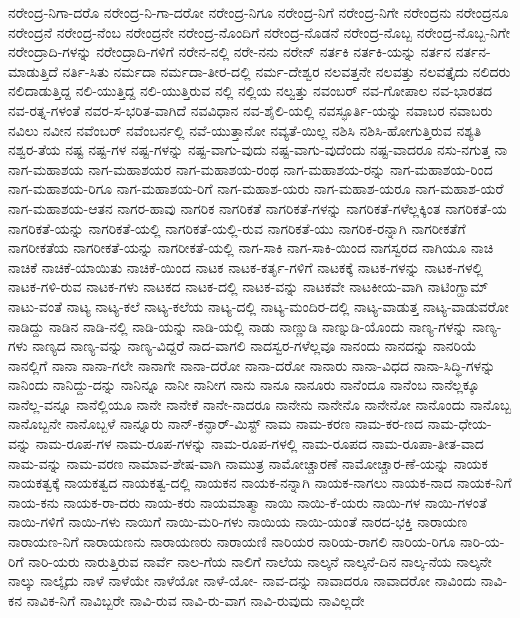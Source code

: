 {ನರೇಂದ್ರ-ನಿಗಾ-ದರೊ
ನರೇಂದ್ರ-ನಿ-ಗಾ-ದರೋ
ನರೇಂದ್ರ-ನಿಗೂ
ನರೇಂದ್ರ-ನಿಗೆ
ನರೇಂದ್ರ-ನಿಗೇ
ನರೇಂದ್ರನು
ನರೇಂದ್ರನೂ
ನರೇಂದ್ರನೆ
ನರೇಂದ್ರ-ನೆಂಬ
ನರೇಂದ್ರನೇ
ನರೇಂದ್ರ-ನೊಂದಿಗೆ
ನರೇಂದ್ರ-ನೊಡನೆ
ನರೇಂದ್ರ-ನೊಬ್ಬ
ನರೇಂದ್ರ-ನೊಬ್ಬ-ನಿಗೇ
ನರೇಂದ್ರಾದಿ-ಗಳನ್ನು
ನರೇಂದ್ರಾದಿ-ಗಳಿಗೆ
ನರೇನ-ನಲ್ಲಿ
ನರೇ-ನನು
ನರೇನ್
ನರ್ತಕಿ
ನರ್ತಕಿ-ಯನ್ನು
ನರ್ತನ
ನರ್ತನ-ಮಾಡುತ್ತಿದೆ
ನರ್ತಿ-ಸಿತು
ನರ್ಮದಾ
ನರ್ಮದಾ-ತೀರ-ದಲ್ಲಿ
ನರ್ಮ-ದೇಶ್ವರ
ನಲವತ್ತನೇ
ನಲವತ್ತು
ನಲವತ್ತೈದು
ನಲಿದರು
ನಲಿದಾಡುತ್ತಿದ್ದ
ನಲಿ-ಯುತ್ತಿದ್ದ
ನಲಿ-ಯುತ್ತಿರುವ
ನಲ್ಲಿ
ನಲ್ಲಿಯ
ನಲ್ವತ್ತು
ನವಂಬರ್
ನವ-ಗೋಪಾಲ
ನವ-ಭಾರತದ
ನವ-ರತ್ನ-ಗಳಂತೆ
ನವರ-ಸ-ಭರಿತ-ವಾಗಿದೆ
ನವವಿಧಾನ
ನವ-ಶೈಲಿ-ಯಲ್ಲಿ
ನವಸ್ಫೂರ್ತಿ-ಯನ್ನು
ನವಾಬರ
ನವಾಬರು
ನವಿಲು
ನವೀನ
ನವೆಂಬರ್
ನವೆಂಬರ್ನಲ್ಲಿ
ನವೆ-ಯುತ್ತಾನೋ
ನವ್ಯತೆ-ಯಿಲ್ಲ
ನಶಿಸಿ
ನಶಿಸಿ-ಹೋಗುತ್ತಿರುವ
ನಶ್ಯತಿ
ನಶ್ವರ-ತೆಯ
ನಷ್ಟ
ನಷ್ಟ-ಗಳ
ನಷ್ಟ-ಗಳನ್ನು
ನಷ್ಟ-ವಾಗು-ವುದು
ನಷ್ಟ-ವಾಗು-ವುದೆಂದು
ನಷ್ಟ-ವಾದರೂ
ನಸು-ನಗುತ್ತ
ನಾ
ನಾಗ-ಮಹಾಶಯ
ನಾಗ-ಮಹಾಶಯರ
ನಾಗ-ಮಹಾಶಯ-ರಂಥ
ನಾಗ-ಮಹಾಶಯ-ರನ್ನು
ನಾಗ-ಮಹಾಶಯ-ರಿಂದ
ನಾಗ-ಮಹಾಶಯ-ರಿಗೂ
ನಾಗ-ಮಹಾಶಯ-ರಿಗೆ
ನಾಗ-ಮಹಾಶ-ಯರು
ನಾಗ-ಮಹಾಶ-ಯರೂ
ನಾಗ-ಮಹಾಶ-ಯರೆ
ನಾಗ-ಮಹಾಶಯ-ಆತನ
ನಾಗರ-ಹಾವು
ನಾಗರಿಕ
ನಾಗರಿಕತೆ
ನಾಗರಿಕತೆ-ಗಳನ್ನು
ನಾಗರಿಕತೆ-ಗಳೆಲ್ಲಕ್ಕಿಂತ
ನಾಗರಿಕತೆ-ಯ
ನಾಗರಿಕತೆ-ಯನ್ನು
ನಾಗರಿಕತೆ-ಯಲ್ಲಿ
ನಾಗರಿಕತೆ-ಯಲ್ಲಿ-ರುವ
ನಾಗರಿಕತೆ-ಯು
ನಾಗರಿಕ-ರನ್ನಾಗಿ
ನಾಗರೀಕತೆಗೆ
ನಾಗರೀಕತೆಯ
ನಾಗರೀಕತೆ-ಯನ್ನು
ನಾಗರೀಕತೆ-ಯಲ್ಲಿ
ನಾಗ-ಸಾಕಿ
ನಾಗ-ಸಾಕಿ-ಯಿಂದ
ನಾಗಸ್ವರದ
ನಾಗಿಯೂ
ನಾಚಿ
ನಾಚಿಕೆ
ನಾಚಿಕೆ-ಯಾಯಿತು
ನಾಚಿಕೆ-ಯಿಂದ
ನಾಟಕ
ನಾಟಕ-ಕರ್ತೃ-ಗಳಿಗೆ
ನಾಟಕಕ್ಕೆ
ನಾಟಕ-ಗಳನ್ನು
ನಾಟಕ-ಗಳಲ್ಲಿ
ನಾಟಕ-ಗಳಿ-ರುವ
ನಾಟಕ-ಗಳು
ನಾಟಕದ
ನಾಟಕ-ದಲ್ಲಿ
ನಾಟಕ-ವನ್ನು
ನಾಟಕವೇ
ನಾಟಕೀಯ-ವಾಗಿ
ನಾಟಿಂಗ್ಹಾಮ್
ನಾಟು-ವಂತೆ
ನಾಟ್ಯ
ನಾಟ್ಯ-ಕಲೆ
ನಾಟ್ಯ-ಕಲೆಯ
ನಾಟ್ಯ-ದಲ್ಲಿ
ನಾಟ್ಯ-ಮಂದಿರ-ದಲ್ಲಿ
ನಾಟ್ಯ-ವಾಡುತ್ತ
ನಾಟ್ಯ-ವಾಡುವರೋ
ನಾಡಿದ್ದು
ನಾಡಿನ
ನಾಡಿ-ನಲ್ಲಿ
ನಾಡಿ-ಯನ್ನು
ನಾಡಿ-ಯಲ್ಲಿ
ನಾಡು
ನಾಣ್ಣುಡಿ
ನಾಣ್ನುಡಿ-ಯೊಂದು
ನಾಣ್ಯ-ಗಳನ್ನು
ನಾಣ್ಯ-ಗಳು
ನಾಣ್ಯದ
ನಾಣ್ಯ-ವನ್ನು
ನಾಣ್ಯ-ವಿದ್ದರೆ
ನಾದ-ವಾಗಲಿ
ನಾದಸ್ವರ-ಗಳೆಲ್ಲವೂ
ನಾನಂದು
ನಾನದನ್ನು
ನಾನರಿಯೆ
ನಾನಲ್ಲಿಗೆ
ನಾನಾ
ನಾನಾ-ಗಲೇ
ನಾನಾಗೇ
ನಾನಾ-ದರೋ
ನಾನಾ-ದರೋ
ನಾನಾರು
ನಾನಾ-ವಿಧದ
ನಾನಾ-ಸಿದ್ಧಿ-ಗಳನ್ನು
ನಾನಿಂದು
ನಾನಿದ್ದು-ದನ್ನು
ನಾನಿನ್ನೂ
ನಾನೀ
ನಾನೀಗ
ನಾನು
ನಾನೂ
ನಾನೂರು
ನಾನೆಂದೂ
ನಾನೆಂಬ
ನಾನೆಲ್ಲಕ್ಕೂ
ನಾನೆಲ್ಲ-ವನ್ನೂ
ನಾನೆಲ್ಲಿಯೂ
ನಾನೇ
ನಾನೇಕೆ
ನಾನೇ-ನಾದರೂ
ನಾನೇನು
ನಾನೇನೊ
ನಾನೇನೋ
ನಾನೊಂದು
ನಾನೊಬ್ಬ
ನಾನೊಬ್ಬನೇ
ನಾನೊಬ್ಬಳೆ
ನಾನ್ನೂರು
ನಾನ್-ಕನ್ಫಾರ್-ಮಿಸ್ಟ್
ನಾಮ
ನಾಮ-ಕರಣ
ನಾಮ-ಕರ-ಣದ
ನಾಮ-ಧೇಯ-ವನ್ನು
ನಾಮ-ರೂಪ-ಗಳ
ನಾಮ-ರೂಪ-ಗಳನ್ನು
ನಾಮ-ರೂಪ-ಗಳಲ್ಲಿ
ನಾಮ-ರೂಪದ
ನಾಮ-ರೂಪಾ-ತೀತ-ವಾದ
ನಾಮ-ವನ್ನು
ನಾಮ-ವರಣ
ನಾಮಾವ-ಶೇಷ-ವಾಗಿ
ನಾಮುತ್ರ
ನಾಮೋಚ್ಚಾರಣೆ
ನಾಮೋಚ್ಚಾರ-ಣೆ-ಯನ್ನು
ನಾಯಕ
ನಾಯಕತ್ವಕ್ಕೆ
ನಾಯಕತ್ವದ
ನಾಯಕತ್ವ-ದಲ್ಲಿ
ನಾಯಕನ
ನಾಯಕ-ನನ್ನಾಗಿ
ನಾಯಕ-ನಾಗಲು
ನಾಯಕ-ನಾದ
ನಾಯಕ-ನಿಗೆ
ನಾಯ-ಕನು
ನಾಯಕ-ರಾ-ದರು
ನಾಯ-ಕರು
ನಾಯಮಾತ್ಮಾ
ನಾಯಿ
ನಾಯಿ-ಕೆ-ಯರು
ನಾಯಿ-ಗಳ
ನಾಯಿ-ಗಳಂತೆ
ನಾಯಿ-ಗಳಿಗೆ
ನಾಯಿ-ಗಳು
ನಾಯಿಗೆ
ನಾಯಿ-ಮರಿ-ಗಳು
ನಾಯಿಯ
ನಾಯಿ-ಯಂತೆ
ನಾರದ-ಭಕ್ತಿ
ನಾರಾಯಣ
ನಾರಾಯಣ-ನಿಗೆ
ನಾರಾಯಣನು
ನಾರಾಯಣರು
ನಾರಾಯಣಿ
ನಾರಿಯರ
ನಾರಿಯ-ರಾಗಲಿ
ನಾರಿಯ-ರಿಗೂ
ನಾರಿ-ಯ-ರಿಗೆ
ನಾರಿ-ಯರು
ನಾರುತ್ತಿರುವ
ನಾರ್ವೆ
ನಾಲ-ಗೆಯ
ನಾಲಿಗೆ
ನಾಲೆಯ
ನಾಲ್ಕನೆ
ನಾಲ್ಕನೆ-ದಿನ
ನಾಲ್ಕ-ನೆಯ
ನಾಲ್ಕನೇ
ನಾಲ್ಕು
ನಾಲ್ಕೈದು
ನಾಳೆ
ನಾಳೆಯೇ
ನಾಳೆಯೋ
ನಾಳೆ-ಯೋ-
ನಾವ-ದನ್ನು
ನಾವಾದರೂ
ನಾವಾದರೋ
ನಾವಿಂದು
ನಾವಿ-ಕನ
ನಾವಿಕ-ನಿಗೆ
ನಾವಿಬ್ಬರೇ
ನಾವಿ-ರುವ
ನಾವಿ-ರು-ವಾಗ
ನಾವಿ-ರುವುದು
ನಾವಿಲ್ಲದೇ
}
